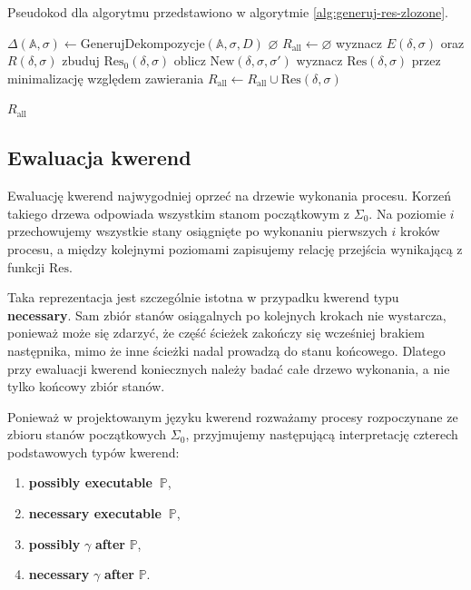 \documentclass[11pt,a4paper]{article}
\theoremstyle{definition}
\begin{document}
Pseudokod dla algorytmu przedstawiono w algorytmie \ref{alg:generuj-res-zlozone}.

\begin{algorithm}[H]
\caption{Pseudokod dla algorytmu generującego funkcję $\mathrm{Res}$ dla akcji złożonej}
\label{alg:generuj-res-zlozone}
\begin{algorithmic}[1]
        \State $\Delta(\mathbb{A},\sigma) \gets \mathrm{GenerujDekompozycje}(\mathbb{A}, \sigma, D)$
            \Return $\varnothing$
        \EndIf
        \State $R_{\mathrm{all}} \leftarrow \varnothing$
            \State wyznacz $E(\delta,\sigma)$ oraz $R(\delta,\sigma)$
            \State zbuduj $\mathrm{Res}_0(\delta,\sigma)$
                \State oblicz $\mathrm{New}(\delta,\sigma,\sigma')$
            \EndFor
            \State wyznacz $\mathrm{Res}(\delta,\sigma)$ przez minimalizację względem zawierania
            \State $R_{\mathrm{all}} \leftarrow R_{\mathrm{all}} \cup \mathrm{Res}(\delta,\sigma)$
        \EndFor
        
        \Return $R_{\mathrm{all}}$
    \EndProcedure
\end{algorithmic}
\end{algorithm}

\subsection{Ewaluacja kwerend}
\label{sec:alg-ewaluacja}

Ewaluację kwerend najwygodniej oprzeć na drzewie wykonania procesu. Korzeń takiego drzewa odpowiada wszystkim stanom początkowym z $\Sigma_0$. Na poziomie $i$ przechowujemy wszystkie stany osiągnięte po wykonaniu pierwszych $i$ kroków procesu, a między kolejnymi poziomami zapisujemy relację przejścia wynikającą z funkcji $\mathrm{Res}$.

Taka reprezentacja jest szczególnie istotna w przypadku kwerend typu \textbf{necessary}. Sam zbiór stanów osiągalnych po kolejnych krokach nie wystarcza, ponieważ może się zdarzyć, że część ścieżek zakończy się wcześniej brakiem następnika, mimo że inne ścieżki nadal prowadzą do stanu końcowego. Dlatego przy ewaluacji kwerend koniecznych należy badać całe drzewo wykonania, a nie tylko końcowy zbiór stanów.

Ponieważ w projektowanym języku kwerend rozważamy procesy rozpoczynane ze zbioru stanów początkowych $\Sigma_0$, przyjmujemy następującą interpretację czterech podstawowych typów kwerend:
\begin{enumerate}
    \item \textbf{possibly executable} $\ \mathbb{P}$,
    \item \textbf{necessary executable} $\ \mathbb{P}$,
    \item \textbf{possibly} $\gamma$ \textbf{after} $\mathbb{P}$,
    \item \textbf{necessary} $\gamma$ \textbf{after} $\mathbb{P}$.
\end{enumerate}
\end{document}
